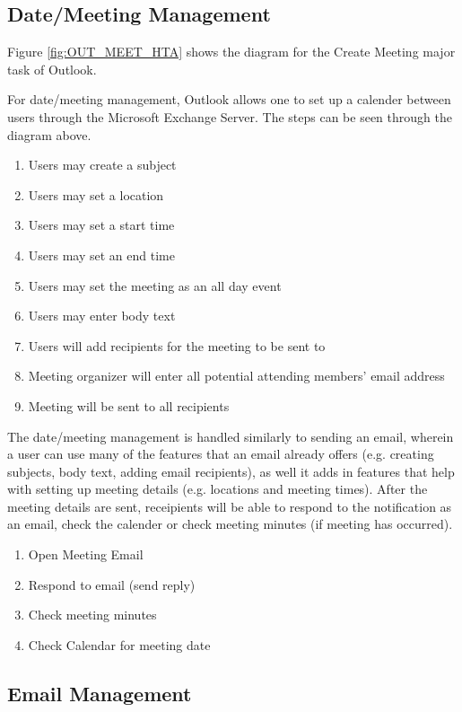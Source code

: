 \documentclass{sigchi}
\begin{document}
\subsection{Date/Meeting Management}

Figure \ref{fig:OUT_MEET_HTA} shows the diagram for the Create Meeting major task of Outlook.

For date/meeting management, Outlook allows one to set up a calender between users through the Microsoft Exchange Server. The steps can be seen through the diagram above.
\begin{enumerate}
\item Users may create a subject
\item Users may set a location
\item Users may set a start time
\item Users may set an end time
\item Users may set the meeting as an all day event
\item Users may enter body text
\item Users will add recipients for the meeting to be sent to
\item Meeting organizer will enter all potential attending members' email address
\item Meeting will be sent to all recipients
\end{enumerate}

The date/meeting management is handled similarly to sending an email, wherein a user can use many of the features that an email already offers (e.g. creating subjects, body text, adding email recipients), as well it adds in features that help with setting up meeting details (e.g. locations and meeting times).
After the meeting details are sent, receipients will be able to respond to the notification as an email, check the calender or check meeting minutes (if meeting has occurred).

\begin{enumerate}
\item Open Meeting Email
\item Respond to email (send reply)
\item Check meeting minutes
\item Check Calendar for meeting date
\end{enumerate}

\subsection{Email Management}
\end{document}
